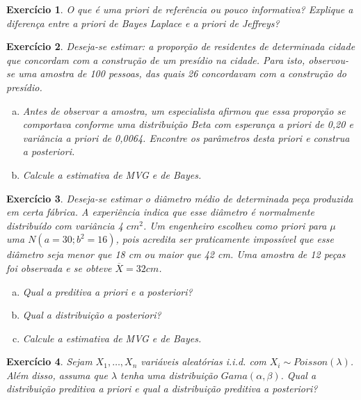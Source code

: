 \documentclass[letter,11pt]{article}
\newtheorem{exer}{Exercício}
\begin{document}
\bigskip
\begin{exer} \rm
O que é uma \textit{priori} de referência ou pouco informativa? Explique a diferença entre a \textit{priori} de Bayes Laplace e a \textit{priori} de Jeffreys?
\end{exer}


\bigskip
\begin{exer} \rm
Deseja-se estimar: a proporção de residentes de determinada cidade que concordam com a construção de um presídio na cidade. Para isto, observou-se uma amostra de 100 pessoas, das quais 26 concordavam com a construção do presídio.
\begin{enumerate}[a)]
  \item Antes de observar a amostra, um especialista afirmou que essa proporção se comportava conforme uma distribuição Beta com esperança \textit{a priori} de 0,20 e variância \textit{a priori} de
0,0064. Encontre os parâmetros desta \textit{priori} e construa \textit{a posteriori}.
  \item Calcule a estimativa de MVG e de Bayes.
\end{enumerate}
\end{exer}


\bigskip
\begin{exer} \rm
Deseja-se estimar o diâmetro médio de determinada peça produzida em certa fábrica. A experiência indica que esse diâmetro é normalmente distribuído com variância 4 $cm^2$. Um engenheiro escolheu como priori para $\mu$ uma $N(a = 30; b^2= 16)$, pois acredita ser praticamente impossível que esse diâmetro seja menor que 18 cm ou maior que 42 cm.
Uma amostra de 12 peças foi observada e se obteve $\overline{X}= 32cm$.
\begin{enumerate}[a)]
  \item Qual a preditiva \textit{a priori} e \textit{a posteriori}?
  \item Qual a distribuição \textit{a posteriori}?
  \item  Calcule a estimativa de MVG e de Bayes.
\end{enumerate}
\end{exer}


\bigskip
\begin{exer} \rm
Sejam $X_1, \ldots,X_n$ variáveis aleatórias i.i.d. com $X_i \sim Poisson(\lambda)$. Além disso, assuma que $\lambda$ tenha uma distribuição $Gama(\alpha, \beta)$. Qual a distribuição preditiva \textit{a priori} e qual a distribuição preditiva \textit{a posteriori}?
\end{exer}
\end{document}
